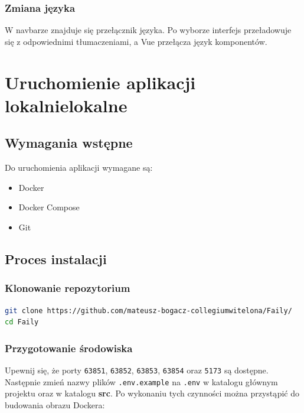 \documentclass[12pt,a4paper]{article}
\begin{document}
\subsubsection{Zmiana języka}
W navbarze znajduje się przełącznik języka. Po wyborze interfejs przeładowuje się z odpowiednimi tłumaczeniami, a Vue przełącza język komponentów.

\newpage

\section{Uruchomienie aplikacji lokalnielokalne}

\subsection{Wymagania wstępne}

Do uruchomienia aplikacji wymagane są:
\begin{itemize}[itemsep=1pt]
    \item Docker
    \item Docker Compose
    \item Git
\end{itemize}

\subsection{Proces instalacji}

\subsubsection{Klonowanie repozytorium}
\begin{lstlisting}[language=bash, caption=Pobranie kodu źródłowego]
git clone https://github.com/mateusz-bogacz-collegiumwitelona/Faily/
cd Faily
\end{lstlisting}

\subsubsection{Przygotowanie środowiska}

Upewnij się, że porty \texttt{63851}, \texttt{63852}, \texttt{63853}, \texttt{63854} oraz \texttt{5173} są dostępne. Następnie zmień nazwy plików \texttt{.env.example} na \texttt{.env} w katalogu głównym projektu oraz w katalogu \textbf{src}. Po wykonaniu tych czynności można przystąpić do budowania obrazu Dockera:
\end{document}
